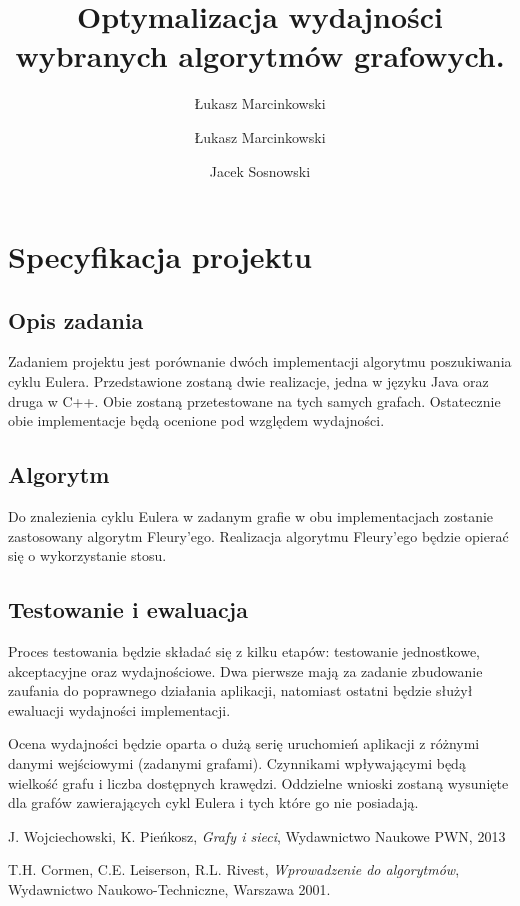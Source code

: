 \documentclass[12pt,oneside,a4paper]{article}
\begin{document}
\author{Łukasz Marcinkowski}
\author{Łukasz Marcinkowski \and Jacek Sosnowski}
\title{Optymalizacja wydajności wybranych algorytmów grafowych.}
\maketitle


\section{Specyfikacja projektu}

\subsection{Opis zadania}

Zadaniem projektu jest porównanie dwóch implementacji algorytmu poszukiwania cyklu Eulera. Przedstawione zostaną dwie realizacje, jedna w języku Java oraz druga w C++. Obie zostaną przetestowane na tych samych grafach. Ostatecznie obie implementacje będą ocenione pod względem wydajności.

\subsection{Algorytm}

Do znalezienia cyklu Eulera w zadanym grafie w obu implementacjach zostanie zastosowany algorytm Fleury'ego. Realizacja algorytmu Fleury'ego będzie opierać się o wykorzystanie stosu. 

\subsection{Testowanie i ewaluacja}

Proces testowania będzie składać się z kilku etapów: testowanie jednostkowe, akceptacyjne oraz wydajnościowe. Dwa pierwsze mają za zadanie zbudowanie zaufania do poprawnego działania aplikacji, natomiast ostatni będzie służył ewaluacji wydajności implementacji. 

Ocena wydajności będzie oparta o dużą serię uruchomień aplikacji z różnymi danymi wejściowymi (zadanymi grafami). Czynnikami wpływającymi będą wielkość grafu i liczba dostępnych krawędzi. Oddzielne wnioski zostaną wysunięte dla grafów zawierających cykl Eulera i tych które go nie posiadają. 

\begin{thebibliography}{9}

 J. Wojciechowski, K. Pieńkosz, \emph{Grafy i sieci}, Wydawnictwo Naukowe PWN, 2013

 T.H. Cormen, C.E. Leiserson, R.L. Rivest, \emph{Wprowadzenie do algorytmów}, Wydawnictwo
Naukowo-Techniczne, Warszawa 2001.

\end{thebibliography}
\end{document}
